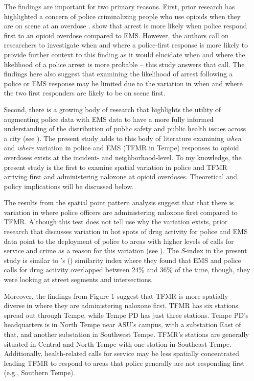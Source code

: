 The findings are important for two primary reasons. First, prior research has highlighted a concern of police criminalizing people who use opioids when they are on scene at an overdose \parencite{bohnert_policing_2011, van_der_meulen_thats_2021}. \textcite{lowder_twoyear_2020} show that arrest is more likely when police respond first to an opioid overdose compared to EMS. However, the authors call on researchers to investigate when and where a police-first response is more likely to provide further context to this finding as it would elucidate when and where the likelihood of a police arrest is more probable -- this study answers that call. The findings here also suggest that examining the likelihood of arrest following a police or EMS response may be limited due to the variation in when and where the two first responders are likely to be on scene first.

Second, there is a growing body of research that highlights the utility of augmenting police data with EMS data to have a more fully informed understanding of the distribution of public safety and public health issues across a city (see \cite{hibdon_use_2024}). The present study adds to this body of literature examining \textit{when} and \textit{where} variation in police and EMS (TFMR in Tempe) responses to opioid overdoses exists at the incident- and neighborhood-level. To my knowledge, the present study is the first to examine spatial variation in police and TFMR arriving first and administering naloxone at opioid overdoses. Theoretical and policy implications will be discussed below.

The results from the spatial point pattern analysis suggest that that there is variation in where police officers are administering naloxone first compared to TFMR. Although this test does not tell use why the variation exists, prior research that discusses variation in hot spots of drug activity for police and EMS data \parencite{hibdon_concentration_2017, hibdon_going_2021} point to the deployment of police to areas with higher levels of calls for service and crime as a reason for this variation (see \cite{engel_police_2003}). The \textit{S}-index in the present study is similar to \citeauthor{hibdon_concentration_2017}'s (\citeyear{hibdon_concentration_2017}) similarity index where they found that EMS and police calls for drug activity overlapped between 24\% and 36\% of the time, though, they were looking at street segments and intersections.

Moreover, the findings from Figure 1 suggest that TFMR is more spatially diverse in where they are administering naloxone first. TFMR has six stations spread out through Tempe, while Tempe PD has just three stations. Tempe PD's headquarters is in North Tempe near ASU's campus, with a substation East of that, and another substation in Southwest Tempe. TFMR's stations are generally situated in Central and North Tempe with one station in Southeast Tempe. Additionally, health-related calls for service may be less spatially concentrated leading TFMR to respond to areas that police generally are not responding first (e.g., Southern Tempe).

